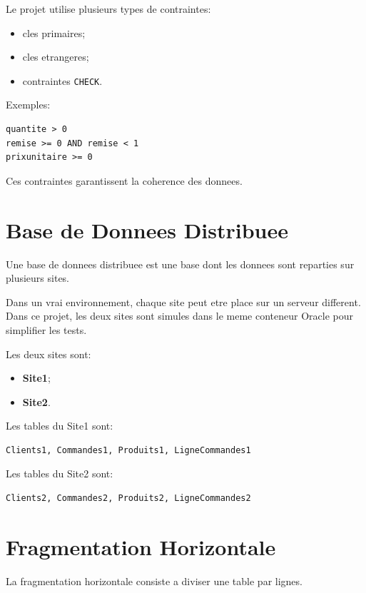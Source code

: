 \documentclass[12pt,a4paper]{report}
\begin{document}
Le projet utilise plusieurs types de contraintes:

\begin{itemize}
    \item cles primaires;
    \item cles etrangeres;
    \item contraintes \texttt{CHECK}.
\end{itemize}

Exemples:

\begin{lstlisting}[style=sqlstyle]
quantite > 0
remise >= 0 AND remise < 1
prixunitaire >= 0
\end{lstlisting}

Ces contraintes garantissent la coherence des donnees.

\chapter{Base de Donnees Distribuee}

Une base de donnees distribuee est une base dont les donnees sont reparties sur plusieurs sites.

Dans un vrai environnement, chaque site peut etre place sur un serveur different. Dans ce projet, les deux sites sont simules dans le meme conteneur Oracle pour simplifier les tests.

Les deux sites sont:

\begin{itemize}
    \item \textbf{Site1};
    \item \textbf{Site2}.
\end{itemize}

Les tables du Site1 sont:

\begin{lstlisting}[style=textstyle]
Clients1, Commandes1, Produits1, LigneCommandes1
\end{lstlisting}

Les tables du Site2 sont:

\begin{lstlisting}[style=textstyle]
Clients2, Commandes2, Produits2, LigneCommandes2
\end{lstlisting}

\chapter{Fragmentation Horizontale}

La fragmentation horizontale consiste a diviser une table par lignes.
\end{document}
